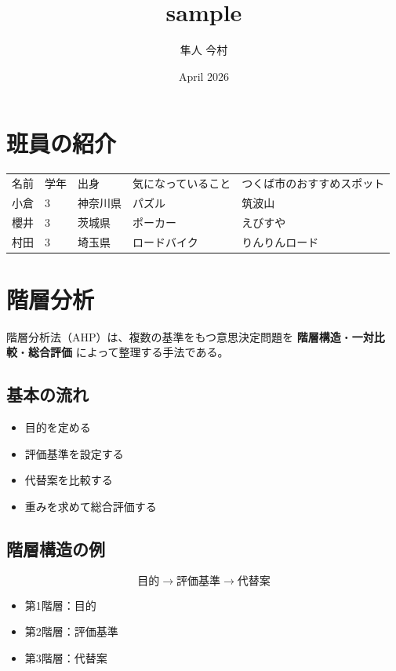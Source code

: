 \documentclass[12pt]{ltjsarticle}
\title{sample}
\author{隼人 今村}
\date{April 2026}
\begin{document}
\maketitle

\section{班員の紹介}

{\def\LTcaptype{none}
\begin{longtable}[]{@{}lllll@{}}
\toprule\noalign{}
\endhead
\bottomrule\noalign{}
\endlastfoot
名前 & 学年 & 出身 & 気になっていること & つくば市のおすすめスポット \\
小倉 & 3 & 神奈川県 & パズル & 筑波山 \\
櫻井 & 3 & 茨城県 & ポーカー & えびすや \\
村田 & 3 & 埼玉県 & ロードバイク & りんりんロード \\
\end{longtable}
}

\section{階層分析}

階層分析法（AHP）は、複数の基準をもつ意思決定問題を
\textbf{階層構造}・\textbf{一対比較}・\textbf{総合評価}
によって整理する手法である。

\subsection{基本の流れ}

\begin{itemize}
\item 目的を定める
\item 評価基準を設定する
\item 代替案を比較する
\item 重みを求めて総合評価する
\end{itemize}

\subsection{階層構造の例}

\[
\text{目的} \rightarrow \text{評価基準} \rightarrow \text{代替案}
\]

\begin{itemize}
\item 第1階層：目的
\item 第2階層：評価基準
\item 第3階層：代替案
\end{itemize}
\end{document}
